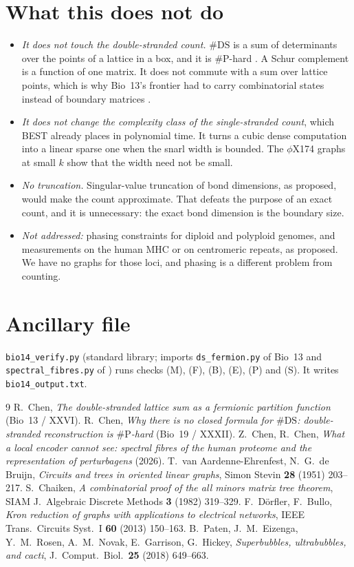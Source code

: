 \documentclass[11pt]{article}
\theoremstyle{plain}
\theoremstyle{definition}
\theoremstyle{remark}
\newcommand{\DS}{\mathrm{DS}}
\newcommand{\sP}{\#\mathrm{P}}
\begin{document}
\section{What this does not do}\label{sec:not}

\begin{itemize}
\item \emph{It does not touch the double-stranded count.} $\#\DS$ is a sum of determinants over the points
of a lattice in a box, and it is $\sP$-hard \cite{Bio19}. A Schur complement is a function of one
matrix. It does not commute with a sum over lattice points, which is why Bio~13's frontier had to carry
combinatorial states instead of boundary matrices \cite{Bio13}.
\item \emph{It does not change the complexity class of the single-stranded count}, which BEST already
places in polynomial time. It turns a cubic dense computation into a linear sparse one when the snarl
width is bounded. The $\phi$X174 graphs at small $k$ show that the width need not be small.
\item \emph{No truncation.} Singular-value truncation of bond dimensions, as proposed, would make the
count approximate. That defeats the purpose of an exact count, and it is unnecessary: the exact bond
dimension is the boundary size.
\item \emph{Not addressed:} phasing constraints for diploid and polyploid genomes, and measurements on
the human MHC or on centromeric repeats, as proposed. We have no graphs for those loci, and phasing is a
different problem from counting.
\end{itemize}

\section*{Ancillary file}
\texttt{bio14\_verify.py} (standard library; imports \texttt{ds\_fermion.py} of Bio~13 and
\texttt{spectral\_fibres.py} of \cite{CC26}) runs checks (M), (F), (B), (E), (P) and (S). It writes
\texttt{bio14\_output.txt}.

\begin{thebibliography}{9}
 R.~Chen, \emph{The double-stranded lattice sum as a fermionic partition function}
(Bio~13 / XXVI).
 R.~Chen, \emph{Why there is no closed formula for $\#\DS$: double-stranded
reconstruction is $\sP$-hard} (Bio~19 / XXXII).
 Z.~Chen, R.~Chen, \emph{What a local encoder cannot see: spectral fibres of the human
proteome and the representation of perturbagens} (2026).
 T.~van Aardenne-Ehrenfest, N.~G.~de Bruijn, \emph{Circuits and trees in oriented linear
graphs}, Simon Stevin \textbf{28} (1951) 203--217.
 S.~Chaiken, \emph{A combinatorial proof of the all minors matrix tree theorem}, SIAM J.\
Algebraic Discrete Methods \textbf{3} (1982) 319--329.
 F.~D\"orfler, F.~Bullo, \emph{Kron reduction of graphs with applications to electrical
networks}, IEEE Trans.\ Circuits Syst.\ I \textbf{60} (2013) 150--163.
\bibitem{Pat18} B.~Paten, J.~M.~Eizenga, Y.~M.~Rosen, A.~M.~Novak, E.~Garrison, G.~Hickey,
\emph{Superbubbles, ultrabubbles, and cacti}, J.\ Comput.\ Biol.\ \textbf{25} (2018) 649--663.
\end{thebibliography}
\end{document}
